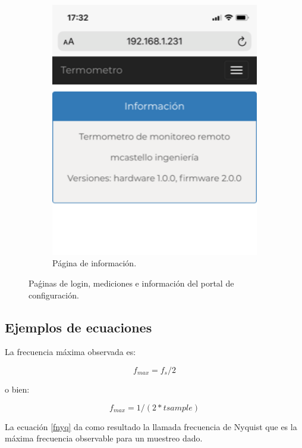 \begin{figure}[!htpb]
\begin{subfigure}[b]{0.3\textwidth}
         \includegraphics[width=1\textwidth]{./Figures/infoWeb.png}
         \caption{Página de información.}
         \label{fig:infoWeb.}
     \end{subfigure}
        \caption{Paǵinas de login, mediciones e información del portal de configuración.}
        \label{fig:homeweb}
\end{figure}


\subsection{Ejemplos de ecuaciones}
La frecuencia máxima observada es:

\begin{equation}
f_{max}= f_{s}/2
\end{equation}

o bien:

\begin{equation}
f_{max}= 1/(2*tsample) \label{fnyq}
\end{equation}


La ecuación \eqref{fnyq} da como resultado la llamada frecuencia de Nyquist que es la máxima frecuencia observable para un muestreo dado.

